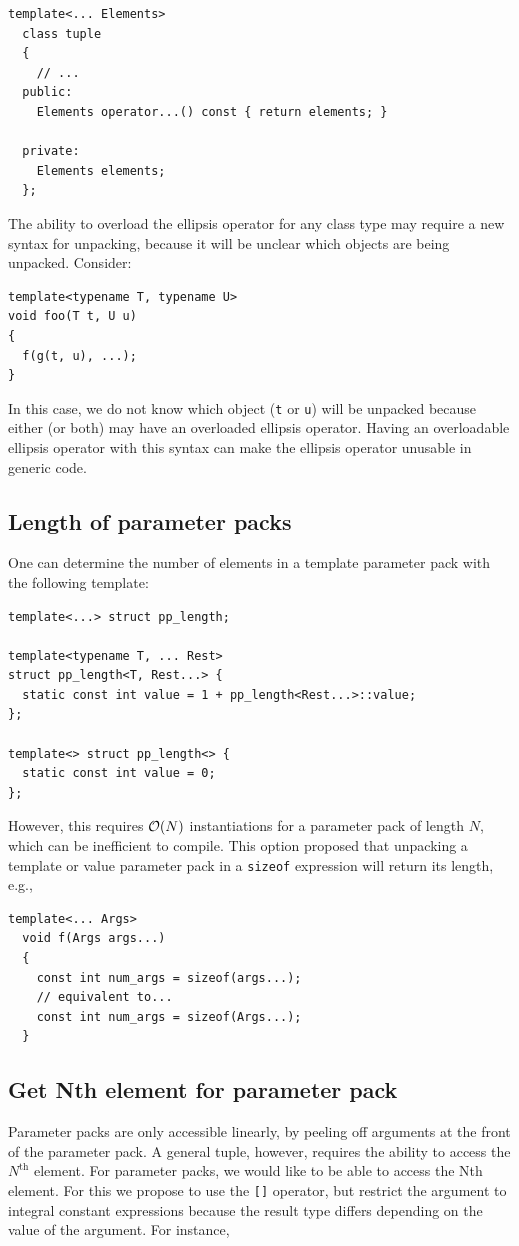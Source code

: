 \documentclass{article}
\begin{document}
\begin{verbatim}
template<... Elements>
  class tuple 
  {
    // ...
  public:
    Elements operator...() const { return elements; }

  private:
    Elements elements;
  };
\end{verbatim}

The ability to overload the ellipsis operator for any class type may
require a new syntax for unpacking, because it will be unclear which
objects are being unpacked. Consider:

\begin{verbatim}
template<typename T, typename U>
void foo(T t, U u)
{
  f(g(t, u), ...);
}
\end{verbatim}

In this case, we do not know which object (\texttt{t} or \texttt{u})
will be unpacked because either (or both) may have an overloaded
ellipsis operator. Having an overloadable ellipsis operator with this
syntax can make the ellipsis operator unusable in generic code.

\subsection{Length of parameter packs}
\label{sec:pp-size}
One can determine the number of elements in a template parameter pack
with the following template:
\begin{verbatim}
template<...> struct pp_length;

template<typename T, ... Rest>
struct pp_length<T, Rest...> {
  static const int value = 1 + pp_length<Rest...>::value; 
};

template<> struct pp_length<> {
  static const int value = 0;
};
\end{verbatim}

However, this requires ${\cal O}(N)$ instantiations for a parameter
pack of length $N$, which can be inefficient to compile. This option
proposed that unpacking a template or value parameter pack in a
\texttt{sizeof} expression will return its length, e.g.,

\begin{verbatim}
template<... Args>
  void f(Args args...)
  {
    const int num_args = sizeof(args...);
    // equivalent to...
    const int num_args = sizeof(Args...);
  }
\end{verbatim}

\subsection{Get Nth element for parameter pack}
Parameter packs are only accessible linearly, by peeling off arguments
at the front of the parameter pack. A general tuple, however, requires
the ability to access the $N^{\text{th}}$ element. For parameter
packs, we would like to be able to access the Nth element. For this we
propose to use the \texttt{[]} operator, but restrict the argument to
integral constant expressions because the result type differs
depending on the value of the argument. For instance,
\end{document}
